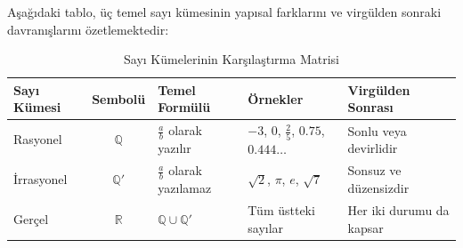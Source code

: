 \documentclass{article}
\begin{document}
Aşağıdaki tablo, üç temel sayı kümesinin yapısal farklarını ve virgülden sonraki davranışlarını özetlemektedir:

\begin{table}[h!]
\centering
\caption{Sayı Kümelerinin Karşılaştırma Matrisi}
\vspace{0.2cm}
\begin{tabularx}{\textwidth}{lcXXX}
\toprule
\textbf{Sayı Kümesi} & \textbf{Sembolü} & \textbf{Temel Formülü} & \textbf{Örnekler} & \textbf{Virgülden Sonrası} \\ \midrule
Rasyonel & $\mathbb{Q}$ & $\frac{a}{b}$ olarak yazılır & $-3$, $0$, $\frac{2}{5}$, $0.75$, $0.444\dots$ & Sonlu veya devirlidir \\ \addlinespace
İrrasyonel & $\mathbb{Q}'$ & $\frac{a}{b}$ olarak yazılamaz & $\sqrt{2}$, $\pi$, $e$, $\sqrt{7}$ & Sonsuz ve düzensizdir \\ \addlinespace
Gerçel & $\mathbb{R}$ & $\mathbb{Q} \cup \mathbb{Q}'$ & Tüm üstteki sayılar & Her iki durumu da kapsar \\ \bottomrule
\end{tabularx}
\end{table}
\end{document}
